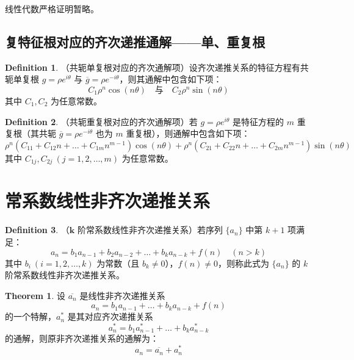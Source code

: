 \documentclass[oneside]{book}
\theoremstyle{definition}
\newtheorem{definition}{Definition}[section]
\newtheorem{theorem}{Theorem}[section]
\begin{document}
线性代数严格证明暂略。

\subsection{复特征根对应的齐次递推通解——单、重复根}

\begin{definition}
	（共轭单复根对应的齐次通解项）设齐次递推关系的特征方程有共轭单复根 \( g = \rho e^{i\theta} \) 与 \( \overline{g} = \rho e^{-i\theta} \)，则其通解中包含如下项：  
	\[
	C_1 \rho^n \cos(n\theta) \quad \text{与} \quad C_2 \rho^n \sin(n\theta)
	\]  
	其中 \( C_1, C_2 \) 为任意常数。  
\end{definition}

\begin{definition}
	（共轭重复根对应的齐次通解项）若 \( g = \rho e^{i\theta} \) 是特征方程的 \( m \) 重复根（其共轭 \( \overline{g} = \rho e^{-i\theta} \) 也为 \( m \) 重复根），则通解中包含如下项：  
	\[
	\rho^n \left( C_{11} + C_{12}n + \dots + C_{1m}n^{m-1} \right) \cos(n\theta) + \rho^n \left( C_{21} + C_{22}n + \dots + C_{2m}n^{m-1} \right) \sin(n\theta)
	\]  
	其中 \( C_{1j}, C_{2j} \ (j=1,2,\dots,m) \) 为任意常数。  
\end{definition}


\section{常系数线性非齐次递推关系}

\begin{definition}
	（\(\boldsymbol{k}\) 阶常系数线性非齐次递推关系）若序列 \( \{a_n\} \) 中第 \( k+1 \) 项满足：  
	\[
	a_n = b_1 a_{n-1} + b_2 a_{n-2} + \dots + b_k a_{n-k} + f(n) \quad (n > k)
	\]  
	其中 \( b_i \ (i=1,2,\dots,k) \) 为常数（且 \( b_k \neq 0 \)），\( f(n) \neq 0 \)，则称此式为 \( \{a_n\} \) 的 \( k \) 阶常系数线性非齐次递推关系。  
\end{definition}

\begin{theorem}
	设 \( \overline{a_n} \) 是线性非齐次递推关系  
	\[
	a_n = b_1 a_{n-1} + \dots + b_k a_{n-k} + f(n)
	\]  
	的一个特解，\( a_n^* \) 是其对应齐次递推关系  
	\[
	a_n^* = b_1 a_{n-1}^* + \dots + b_k a_{n-k}^*
	\]  
	的通解，则原非齐次递推关系的通解为：  
	\[
	a_n = \overline{a_n} + a_n^*
	\]  
\end{theorem}
\end{document}
